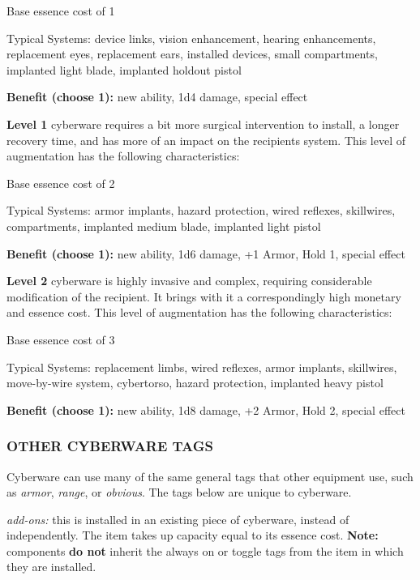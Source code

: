 \documentclass[oneside,10pt]{article}
\begin{document}
\begin{multicols}{2}
\begin{dent}
\tcirc{} Base essence cost of 1

\tcirc{} Typical Systems: device links, vision enhancement,
hearing enhancements, replacement eyes, replacement
ears, installed devices, small compartments, implanted
light blade, implanted holdout pistol

\tcirc{} \textbf{Benefit (choose 1):} new ability, 1d4 damage, special
effect
\end{dent}
\textbf{Level 1} cyberware requires a bit more surgical intervention
to install, a longer recovery time, and has more of an impact
on the recipients system. This level of augmentation has the
following characteristics:
\begin{dent}

\tcirc{} Base essence cost of 2

\tcirc{} Typical Systems: armor implants, hazard protection,
wired reflexes, skillwires, compartments, implanted
medium blade, implanted light pistol

\tcirc{} \textbf{Benefit (choose 1):} new ability, 1d6 damage, +1 Armor, Hold 1, special effect
\end{dent}
\textbf{Level 2} cyberware is highly invasive and complex, requiring
considerable modification of the recipient. It brings with it a
correspondingly high monetary and essence cost. This level
of augmentation has the following characteristics:
\begin{dent}

\tcirc{} Base essence cost of 3

\tcirc{} Typical Systems: replacement limbs, wired reflexes, armor implants, skillwires, move-by-wire system, cybertorso, hazard protection, implanted heavy pistol

\tcirc{} \textbf{Benefit (choose 1):} new ability, 1d8 damage, +2 Armor, Hold 2, special effect
\end{dent}
\subsubsection{OTHER CYBERWARE TAGS}
Cyberware can use many of the same general tags that other
equipment use, such as \textit{armor}, \textit{range}, or \textit{obvious}. The tags
below are unique to cyberware.
\begin{dent}

\textit{add-ons:} this is installed in an existing piece of cyberware,
instead of independently. The item takes up capacity equal
to its essence cost. \textbf{Note:} components \textbf{do not} inherit the
always on or toggle tags from the item in which they are
installed.


\end{dent}
\end{multicols}
\end{document}
